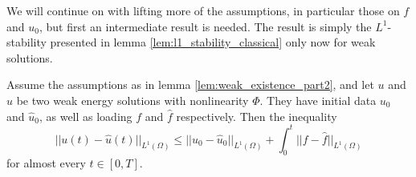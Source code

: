 \documentclass[11pt, a4paper]{article}
\begin{document}
We will continue on with lifting more of the assumptions, in particular those on $f$ and $u_0$, but first an intermediate result is needed. The result is simply the $L^1$-stability presented in lemma \ref{lem:l1_stability_classical} only now for weak solutions.

\begin{proposition}
\label{prop:l1_stability_weak_part1}
Assume the assumptions as in lemma \ref{lem:weak_existence_part2}, and let $u$ and $\hat{u}$ be two weak energy solutions with nonlinearity $\Phi$. They have initial data $u_0$ and $\hat{u}_0$, as well as loading $f$ and $\hat{f}$ respectively. Then the inequality
\begin{equation}
||u(t) - \hat{u}(t)||_{L^1(\Omega)} \leq ||u_0 - \hat{u}_0||_{L^1(\Omega)} + \int_0^t||f-\hat{f}||_{L^1(\Omega)}
\end{equation}
for almost every $t\in [0,T]$.
\end{proposition}
\end{document}
